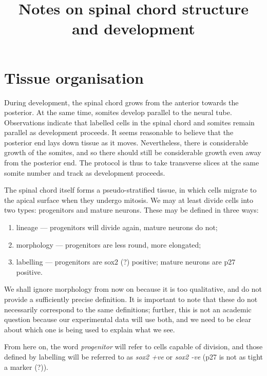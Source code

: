 \documentclass[10pt,english]{article}
\begin{document}
\title{Notes on spinal chord structure and development}

\maketitle

\section{Tissue organisation}

During development, the spinal chord grows from the anterior towards the
posterior. At the same time, somites develop parallel to the neural tube.
Observations indicate that labelled cells in the spinal chord and somites
remain parallel as development proceeds. It seems reasonable to believe that 
the posterior end lays down tissue as it moves. Nevertheless, there is
considerable growth of the somites, and so there should still be considerable
growth even away from the posterior end. The protocol is thus to take transverse slices at the same somite number and track as development proceeds.

The spinal chord itself forms a pseudo-stratified tissue, in which cells migrate
to the apical surface when they undergo mitosis. We may at least divide cells
into two types: progenitors and mature neurons. These may be defined in three
ways:

\begin{enumerate}
\item lineage --- progenitors will divide again, mature neurons do not;
\item morphology --- progenitors are less round, more elongated;
\item labelling --- progenitors are sox2 (?) positive; mature neurons are p27
	positive.
\end{enumerate}

We shall ignore morphology from now on because it is too qualitative, and do not
provide a sufficiently precise definition. It is important to note that these do 
not necessarily correspond to the same definitions; further, this is not an
academic question because our experimental data will use both, and we need to be
clear about which one is being used to explain what we see.

From here on, the word \emph{progenitor} will refer to cells capable of division,
and those defined by labelling will be referred to as \emph{sox2 +ve} or 
\emph{sox2 -ve} (p27 is not as tight a marker (?)). 
\end{document}
